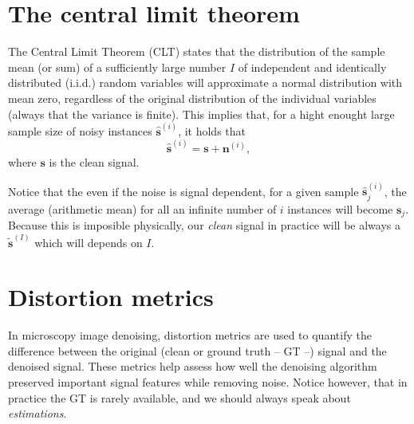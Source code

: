 \documentclass{article}
\begin{document}




\section{The central limit theorem}
\label{sec:CLT}

The Central Limit Theorem (CLT) states that the distribution of the
sample mean (or sum) of a sufficiently large number $I$ of independent
and identically distributed (i.i.d.) random variables will approximate
a normal distribution with mean zero, regardless of the original
distribution of the individual variables \cite{kendall1968advanced}
(always that the variance is finite). This implies that, for a hight
enought large sample size of noisy instances $\hat{\mathbf{s}}^{(i)}$,
it holds that
\begin{equation}
  \hat{\mathbf{s}}^{(i)} = \mathbf{s} + \mathbf{n}^{(i)},
\end{equation}
where $\mathbf{s}$ is the clean signal.

Notice that the even if the noise is signal dependent, for a given
sample $\hat{\mathbf{s}}^{(i)}_j$, the average (arithmetic mean) for
all an infinite number of $i$ instances will become
$\mathbf{s}_j$. Because this is imposible physically, our \emph{clean}
signal in practice will be always a $\tilde{\mathbf{s}}^{(I)}$ which
will depends on $I$.


\section{Distortion metrics}

In microscopy image denoising, distortion metrics are used to quantify
the difference between the original (clean or ground truth -- GT --)
signal and the denoised signal. These metrics help assess how well the
denoising algorithm preserved important signal features while removing
noise. Notice however, that in practice the GT is rarely available, and
we should always speak about \emph{estimations}.
\end{document}
